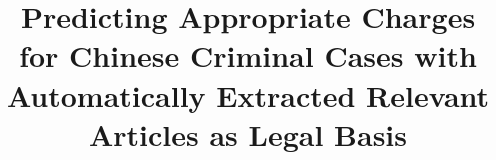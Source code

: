 \documentclass{article}
\title{Predicting Appropriate Charges for Chinese Criminal Cases with Automatically Extracted Relevant Articles as Legal Basis}
\begin{document}
\begin{CJK*}{UTF8}{gbsn}  

\maketitle









\clearpage



\end{CJK*}  
\end{document}
